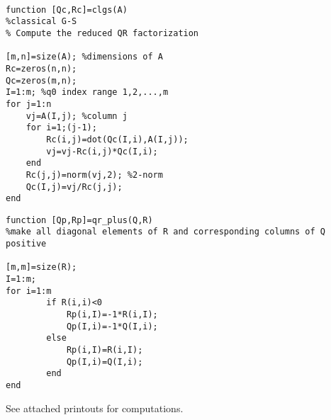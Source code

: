 \documentclass[12pt]{article}
\numberwithin{equation}{section}
\begin{document}
\begin{enumerate}
\begin{lstlisting}
\end{lstlisting}
\begin{lstlisting}

function [Qc,Rc]=clgs(A)
%classical G-S
% Compute the reduced QR factorization

[m,n]=size(A); %dimensions of A
Rc=zeros(n,n);
Qc=zeros(m,n);
I=1:m; %q0 index range 1,2,...,m
for j=1:n
    vj=A(I,j); %column j
    for i=1;(j-1);
        Rc(i,j)=dot(Qc(I,i),A(I,j));
        vj=vj-Rc(i,j)*Qc(I,i);
    end
    Rc(j,j)=norm(vj,2); %2-norm
    Qc(I,j)=vj/Rc(j,j);
end
\end{lstlisting}
\begin{lstlisting}
function [Qp,Rp]=qr_plus(Q,R)
%make all diagonal elements of R and corresponding columns of Q positive

[m,m]=size(R);
I=1:m;
for i=1:m
        if R(i,i)<0
            Rp(i,I)=-1*R(i,I);
            Qp(I,i)=-1*Q(I,i);
        else
            Rp(i,I)=R(i,I);
            Qp(I,i)=Q(I,i);
        end
end
\end{lstlisting}
See attached printouts for computations.

\end{enumerate}
\end{document}
